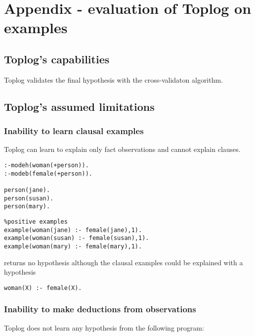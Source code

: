 \chapter{Appendix - evaluation of Toplog on examples}\label{appendix_toplog}

\section{Toplog's capabilities}
Toplog validates the final hypothesis with the cross-validaton algorithm.

\section{Toplog's assumed limitations}

\subsection{Inability to learn clausal examples}\label{toplog_clausal_examples}
Toplog can learn to explain only fact observations and cannot explain clauses.

\begin{minipage}[t]{.38\textwidth}
\begin{lstlisting}
:-modeh(woman(+person)).
:-modeb(female(+person)).

person(jane).
person(susan).
person(mary).
\end{lstlisting}
\end{minipage}
\begin{minipage}[t]{.20\textwidth}
\begin{lstlisting}
%positive examples
example(woman(jane) :- female(jane),1).
example(woman(susan) :- female(susan),1).
example(woman(mary) :- female(mary),1).
\end{lstlisting}
\end{minipage}

returns no hypothesis although the clausal examples could be explained with a hypothesis
\begin{lstlisting}
woman(X) :- female(X).
\end{lstlisting}

\subsection{Inability to make deductions from observations}
Toplog does not learn any hypothesis from the following program:

